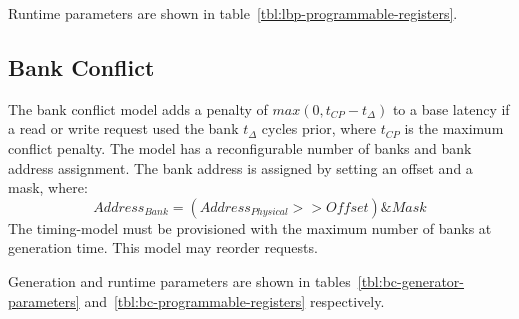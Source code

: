 \noindent Runtime parameters are shown in table~\ref{tbl:lbp-programmable-registers}.

\begin{table}
\begin{center}
\end{center}
\caption{Programmable registers of the latency-bandwidth pipe.}
\label{tbl:lbp-programmable-registers}
\end{table}%

\clearpage
\subsection{Bank Conflict}\label{sec:bank-conflict}

The bank conflict model adds a penalty of $max(0, t_{CP} - t_{\Delta})$ to a
base latency if a read or write request used the bank $t_{\Delta}$ cycles
prior, where $t_{CP}$ is the maximum conflict penalty. The model has a
reconfigurable number of banks and bank address assignment.  The bank address
is assigned by setting an offset and a mask, where: $$Address_{Bank} =
(Address_{Physical} >> Offset) \& Mask$$  The timing-model must be provisioned
with the maximum number of banks at generation time. This model may reorder requests.

\noindent Generation and runtime parameters are shown in
tables~\ref{tbl:bc-generator-parameters}
and~\ref{tbl:bc-programmable-registers} respectively.

